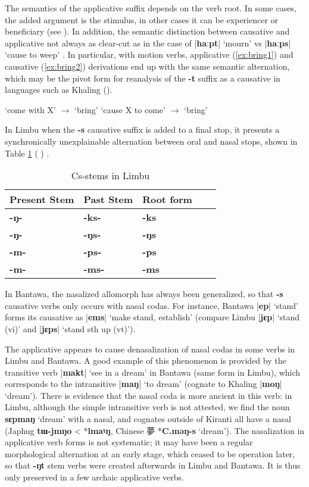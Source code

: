 \documentclass[oneside,a4paper,11pt]{article}
\newcommand{\ipa}[1]{\textbf{{\phon\mbox{#1}}}} %
\newcommand{\zh}[1]{{\cn #1}}
\newcommand{\dhatu}[2]{|\ipa{#1}| `#2'}
\begin{document}
The semantics of the applicative suffix depends on the verb root. In some cases, the added argument is the stimulus, in other cases it can be experiencer or beneficiary (see \citealt{jacques15derivational.khaling}). In addition, the semantic distinction between causative and applicative not always as clear-cut as in the case of \dhatu{haːpt}{mourn} vs \dhatu{haːps}{cause to weep} . In particular, with motion verbs, applicative (\ref{ex:bring1}) and causative (\ref{ex:bring2}) derivations end up with the same semantic alternation, which may be the pivot form for reanalysis of the \ipa{-t} suffix as a causative in languages such as Khaling (\citealt{jacques15derivational.khaling}).
\begin{exe}
\ex \label{ex:bring1}
\glt `come with X' $\rightarrow$ `bring'
\ex \label{ex:bring2}
\glt `cause X to come' $\rightarrow$ `bring'
\end{exe}
 
In Limbu when the \ipa{-s} causative suffix is added to a final stop, it presents a synchronically unexplainable alternation between oral and nasal stops, shown in Table \ref{tab:Cs.limbu} (\citealt{driem87} \citealt[xiii]{michailovsky02dico}) .

\begin{table}[H]
\caption{Cs-stems in Limbu} \centering \label{tab:Cs.limbu}
\begin{tabular}{lllll}
\toprule
Present Stem & Past Stem & Root form \\
\midrule
\ipa{-ŋ-} & \ipa{-ks-} & \ipa{-ks} \\
\ipa{-ŋ-} & \ipa{-ŋs-} & \ipa{-ŋs} \\
\ipa{-m-} & \ipa{-ps-} & \ipa{-ps} \\
\ipa{-m-} & \ipa{-ms-} & \ipa{-ms} \\
\bottomrule
\end{tabular}
\end{table} 

In Bantawa, the nasalized allomorph has always been generalized, so that \ipa{-s} causative verbs only occurs with nasal codas. For instance, Bantawa \dhatu{ep}{stand} forms its causative as \dhatu{ems}{make stand, establish} (compare Limbu \dhatu{jɛp}{stand (vi)}  and \dhatu{jɛps}{stand sth up (vt)}).

The applicative appears to cause denasalization of nasal codas in some verbs in Limbu and Bantawa. A good example of this phenomenon is provided by the transitive verb \dhatu{makt}{see in a dream}	in Bantawa (same form in Limbu), which corresponds to the intransitive \dhatu{maŋ}{to dream} (cognate to Khaling \dhatu{moŋ}{dream}). There is evidence that the nasal coda is more ancient in this verb: in Limbu, although the simple intransitive verb is not attested, we find the noun \ipa{sɛpmaŋ} `dream' with a nasal, and cognates outside of Kiranti all have a nasal (Japhug \ipa{tɯ-jmŋo} < *\ipa{lmaˠŋ}, Chinese \zh{夢} *\ipa{C.məŋ-s} `dream'). The nasalization in applicative verb forms is not systematic; it may have been a regular morphological alternation at an early stage, which ceased to be operation later, so that \ipa{-ŋt} stem verbs were created afterwards in Limbu and Bantawa. It is thus only preserved in a few archaic applicative verbs.
\end{document}
